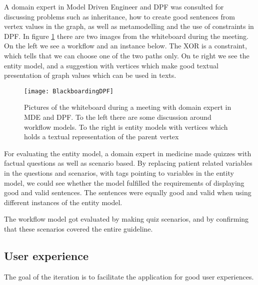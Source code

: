 A domain expert in Model Driven Engineer and DPF was consulted for discussing problems such as inheritance, how to create good sentences from vertex values in the graph, as well as metamodelling and the use of constraints in DPF. In figure \ref{fig:BlackboardingDPF} there are two images from the whiteboard during the meeting. On the left we see a workflow and an instance below. The XOR is a constraint, which tells that we can choose one of the two  paths only. On te right we see the entity model, and a suggestion with vertices which make good textual presentation of graph values which can be used in texts. 

\begin{figure}[h!]
	\label{fig:BlackboardingDPF}
	\texttt{[image: BlackboardingDPF]}
	\caption {Pictures of the whiteboard during a meeting with domain expert in MDE and DPF. To the left there are some discussion around workflow models. To the right is entity models with vertices which holds a textual representation of the parent vertex}
\end{figure}

For evaluating the entity model, a domain expert in medicine made quizzes with factual questions as well as scenario based. By replacing patient related variables in the questions and scenarios, with tags pointing to variables in the entity model, we could see whether the model fulfilled the requirements of displaying good and valid sentences. The sentences were equally good and valid when using different instances of the entity model.

The workflow model got evaluated by making quiz scenarios, and by confirming that these scenarios covered the entire guideline.



 
\subsection{User experience}
The goal of the iteration is to facilitate the application for good user experiences.

